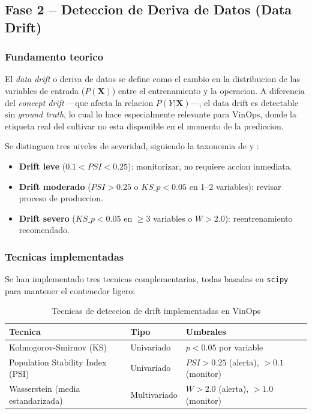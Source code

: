 
\subsection{Fase 2 -- Deteccion de Deriva de Datos (Data Drift)}

\subsubsection{Fundamento teorico}

El \textit{data drift} o deriva de datos se define como el cambio en la distribucion de las variables de entrada ($P(\mathbf{X})$) entre el entrenamiento y la operacion. A diferencia del \textit{concept drift} ---que afecta la relacion $P(Y|\mathbf{X})$---, el data drift es detectable sin \textit{ground truth}, lo cual lo hace especialmente relevante para VinOps, donde la etiqueta real del cultivar no esta disponible en el momento de la prediccion.

Se distinguen tres niveles de severidad, siguiendo la taxonomia de \cite{alibi_detect} y \cite{nannyml}:

\begin{itemize}
    \item \textbf{Drift leve} ($0.1 < PSI < 0.25$): monitorizar, no requiere accion inmediata.
    \item \textbf{Drift moderado} ($PSI > 0.25$ o $KS\_p < 0.05$ en 1--2 variables): revisar proceso de produccion.
    \item \textbf{Drift severo} ($KS\_p < 0.05$ en $\geq 3$ variables o $W > 2.0$): reentrenamiento recomendado.
\end{itemize}

\subsubsection{Tecnicas implementadas}

Se han implementado tres tecnicas complementarias, todas basadas en \texttt{scipy} para mantener el contenedor ligero:

\begin{table}[htbp]
\centering
\caption{Tecnicas de deteccion de drift implementadas en VinOps}
\label{tab:tecnicas-drift}
\begin{tabular}{@{}llp{5.5cm}@{}}
\toprule
\textbf{Tecnica} & \textbf{Tipo} & \textbf{Umbrales} \\
\midrule
Kolmogorov-Smirnov (KS) & Univariado & $p < 0.05$ por variable \\
Population Stability Index (PSI) & Univariado & $PSI > 0.25$ (alerta), $> 0.1$ (monitor) \\
Wasserstein (media estandarizada) & Multivariado & $W > 2.0$ (alerta), $> 1.0$ (monitor) \\
\bottomrule
\end{tabular}
\end{table}

